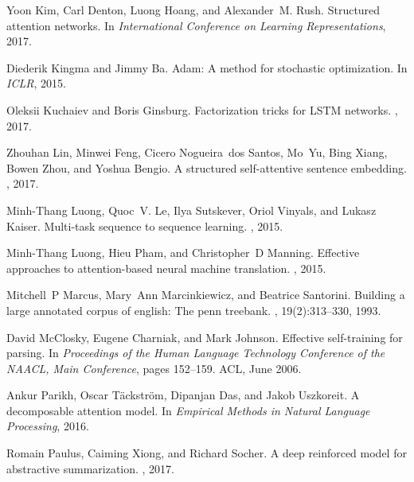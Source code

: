 \documentclass{article}
\begin{document}
\begin{thebibliography}{10}
  Yoon Kim, Carl Denton, Luong Hoang, and Alexander~M. Rush.
  \newblock Structured attention networks.
  \newblock In {\em International Conference on Learning Representations},
  2017.

  Diederik Kingma and Jimmy Ba.
  \newblock Adam: A method for stochastic optimization.
  \newblock In {\em ICLR}, 2015.

  Oleksii Kuchaiev and Boris Ginsburg.
  \newblock Factorization tricks for {LSTM} networks.
  , 2017.

  Zhouhan Lin, Minwei Feng, Cicero Nogueira~dos Santos, Mo~Yu, Bing Xiang,
  Bowen
  Zhou, and Yoshua Bengio.
  \newblock A structured self-attentive sentence embedding.
  , 2017.

  Minh-Thang Luong, Quoc~V. Le, Ilya Sutskever, Oriol Vinyals, and Lukasz
  Kaiser.
  \newblock Multi-task sequence to sequence learning.
  , 2015.

  Minh-Thang Luong, Hieu Pham, and Christopher~D Manning.
  \newblock Effective approaches to attention-based neural machine translation.
  , 2015.

  Mitchell~P Marcus, Mary~Ann Marcinkiewicz, and Beatrice Santorini.
  \newblock Building a large annotated corpus of english: The penn treebank.
  , 19(2):313--330, 1993.

  David McClosky, Eugene Charniak, and Mark Johnson.
  \newblock Effective self-training for parsing.
  \newblock In {\em Proceedings of the Human Language Technology Conference of
      the NAACL, Main Conference}, pages 152--159. ACL, June 2006.

  Ankur Parikh, Oscar Täckström, Dipanjan Das, and Jakob Uszkoreit.
  \newblock A decomposable attention model.
  \newblock In {\em Empirical Methods in Natural Language Processing}, 2016.

  Romain Paulus, Caiming Xiong, and Richard Socher.
  \newblock A deep reinforced model for abstractive summarization.
  , 2017.


\end{thebibliography}
\end{document}
